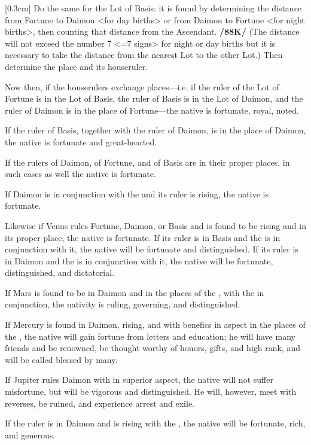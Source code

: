 [0.3cm]
Do the same for the Lot of Basis: it is found by determining the distance from Fortune to Daimon <for day births> or from Daimon to Fortune <for night births>, then counting that distance from the Ascendant. \textbf{/88K/} (The distance will not exceed the number 7 <=7 signs> for night or day births but it is necessary to take the distance from the nearest Lot to the other Lot.) Then determine the place and its houseruler.

Now then, if the houserulers exchange places—i.e. if the ruler of the Lot of Fortune is in the Lot of Basis, the ruler of Basis is in the Lot of Daimon, and the ruler of Daimon is in the place of Fortune—the native is fortunate, royal, noted. 

If the ruler of Basis, together with the ruler of Daimon, is in the place of Daimon, the native is fortunate and great-hearted. 

If the rulers of Daimon, of Fortune, and of Basis are in
their proper places, in such cases as well the native is fortunate. 

If Daimon  is in conjunction with the \Sun\xspace and its ruler is rising, the native is fortunate. 

Likewise if Venus rules Fortune, Daimon, or Basis and is found to be rising and in its proper place, the native is fortunate. If its ruler is in Basis and the \Moon\xspace is in conjunction with it, the native will be fortunate and distinguished. If its ruler is in Daimon and the \Sun\xspace is in conjunction with it, the native will be fortunate, distinguished, and dictatorial.

If Mars is found to be in Daimon and in the places of the \Moon, with the \Moon\xspace in conjunction, the nativity is ruling, governing, and distinguished. 

If Mercury is found in Daimon, rising, and with benefics in aspect in the places of the \Moon, the native will gain fortune from letters and education; he will have
many friends and be renowned, be thought worthy of honors, gifts, and high rank, and will be called blessed by many. 

If Jupiter rules Daimon with \Mars\xspace in superior aspect, the native will not suffer misfortune, but will be vigorous and distinguished. He will, however, meet with reverses, be ruined, and experience arrest and exile. 

If the ruler is in Daimon and is rising with the \Moon, the native will be fortunate, rich, and generous. 

